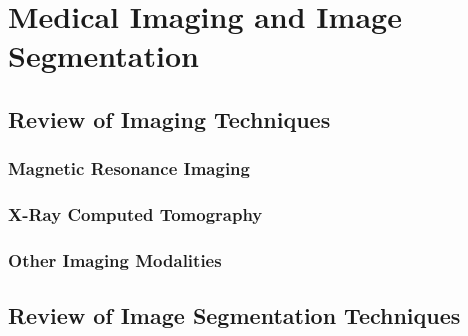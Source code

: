 \chapter{Medical Imaging and Image Segmentation}
%

\section{Review of Imaging Techniques}
\label{Review of Imaging Techniques}

\subsection{Magnetic Resonance Imaging}
\label{Magnetic Resonance Imaging}

\subsection{X-Ray Computed Tomography}
\label{X-Ray Computed Tomography}

\subsection{Other Imaging Modalities}
\label{Other Imaging Modalities}

\section{Review of Image Segmentation Techniques}
\label{Review of Image Segmentation Techniques}

